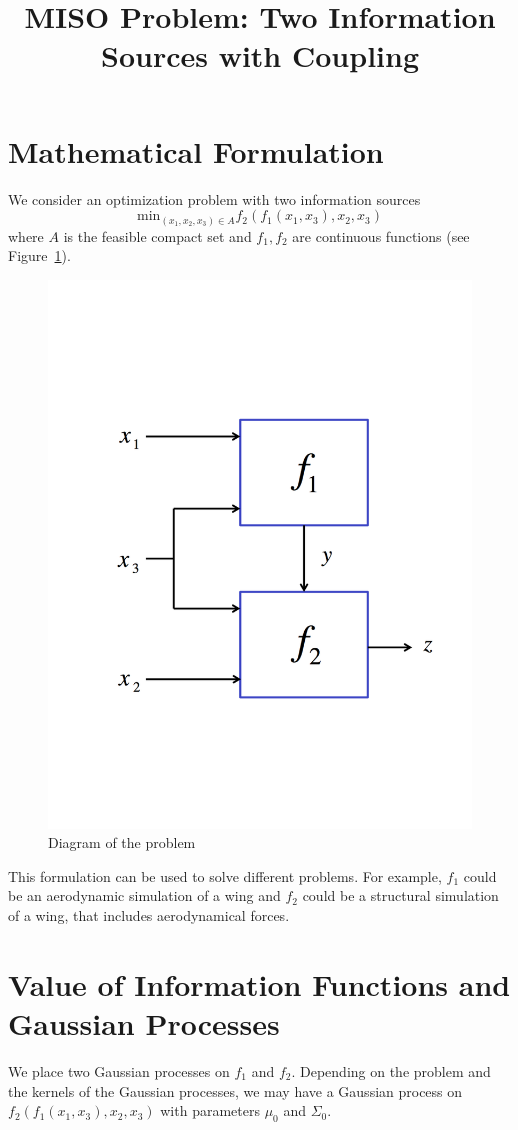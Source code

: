 \documentclass[12pt,english]{article}
\author{ }
\date{}
\begin{document}
\title{MISO Problem: Two Information Sources with Coupling}

\maketitle

\section{Mathematical Formulation}

We consider an optimization problem with two information sources
\[
\mbox{min}_{\left(x_{1},x_{2},x_{3}\right)\in A}f_{2}\left(f_{1}\left(x_{1},x_{3}\right),x_{2},x_{3}\right)
\]
where $A$ is the feasible compact set and $f_{1},f_{2}$ are continuous
functions (see Figure~\ref{fig:fig1}). 



\begin{figure}[htp]
\centering
\includegraphics[width=.5\textwidth]{01.pdf}
\caption{Diagram of the problem}
\label{fig:fig1}
\end{figure}


This formulation can be used to solve different problems. For example,
$f_{1}$ could be an aerodynamic simulation of a wing and $f_{2}$
could be a structural simulation of a wing, that includes aerodynamical
forces.

\section{Value of Information Functions and Gaussian Processes}

We place two Gaussian processes on $f_{1}$ and $f_{2}$. Depending on the problem and the kernels of the Gaussian processes, we may have a Gaussian process
on $f_{2}\left(f_{1}\left(x_{1},x_{3}\right),x_{2},x_{3}\right)$ with parameters $\mu_{0}$ and $\Sigma_{0}$.
\end{document}
